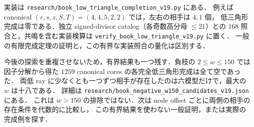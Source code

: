 実装は \nolinkurl{research/book_low_triangle_completion_v19.py} にある．
例えば canonical $(r,s,z,S,T)=(4,4,5,2,2)$ では，左右の相手は $4,1$ 個，
低三角形完成は零である．独立 signed-divisor catalog（各奇数高分母 $\le21$）との
$168$ 照合と，共鳴を含む実装検算は \nolinkurl{verify_book_low_triangle_v19.py} に置く．
一般の有限完成定理の証明と，この有界な実装照合の量化は区別する．

今後の探索を重複させないため，有界結果も一つ残す．負枝の $2\le w\le150$ では
因子分解から得た $1259$ canonical cores の各完全低三角形完成は全て空であった．
両低 ray に少なくとも一つずつ相手が存在したのは六模型だけで，最大の $w$ は十八である．
詳細は \nolinkurl{research/book_negative_w150_candidates_v19.json} にある．
これは $w>150$ の排除ではない．次は node offset ごとに両側の相手の存在条件を代数的に比較し，
この有界結果を使わない一般証明，または実際の完成例を探す．
